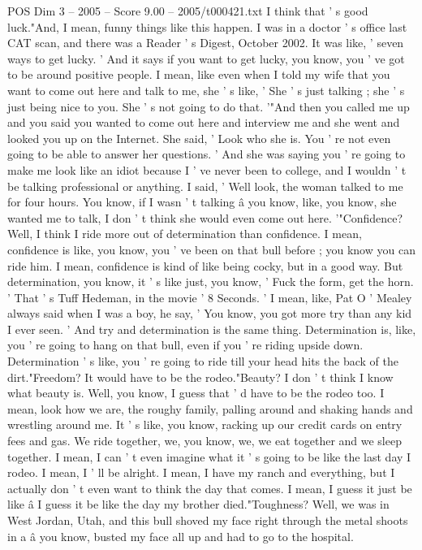 \begin{textsample}{POS Dim 3 – 2005 – Score 9.00 – 2005/t000421.txt}
I think that ' s good luck."And, I mean, funny things like this happen.
I was in a doctor ' s office last CAT scan, and there was a Reader ' s Digest, October 2002.
It was like, ' seven ways to get lucky. ' And it says if you want to get lucky, you know, you ' ve got to be around positive people.
I mean, like even when I told my wife that you want to come out here and talk to me, she ' s like, ' She ' s just talking ; she ' s just being nice to you.
She ' s not going to do that. '"And then you called me up and you said you wanted to come out here and interview me and she went and looked you up on the Internet.
She said, ' Look who she is.
You ' re not even going to be able to answer her questions. ' And she was saying you ' re going to make me look like an idiot because I ' ve never been to college, and I wouldn ' t be talking professional or anything.
I said, ' Well look, the woman talked to me for four hours.
You know, if I wasn ' t talking â you know, like, you know, she wanted me to talk, I don ' t think she would even come out here. '"Confidence?
Well, I think I ride more out of determination than confidence.
I mean, confidence is like, you know, you ' ve been on that bull before ; you know you can ride him.
I mean, confidence is kind of like being cocky, but in a good way.
But determination, you know, it ' s like just, you know, ' Fuck the form, get the horn. ' That ' s Tuff Hedeman, in the movie ' 8 Seconds. ' I mean, like, Pat O ' Mealey always said when I was a boy, he say, ' You know, you got more try than any kid I ever seen. ' And try and determination is the same thing.
Determination is, like, you ' re going to hang on that bull, even if you ' re riding upside down.
Determination ' s like, you ' re going to ride till your head hits the back of the dirt."Freedom?
It would have to be the rodeo."Beauty?
I don ' t think I know what beauty is.
Well, you know, I guess that ' d have to be the rodeo too.
I mean, look how we are, the roughy family, palling around and shaking hands and wrestling around me.
It ' s like, you know, racking up our credit cards on entry fees and gas.
We ride together, we, you know, we, we eat together and we sleep together.
I mean, I can ' t even imagine what it ' s going to be like the last day I rodeo.
I mean, I ' ll be alright.
I mean, I have my ranch and everything, but I actually don ' t even want to think the day that comes.
I mean, I guess it just be like â I guess it be like the day my brother died."Toughness?
Well, we was in West Jordan, Utah, and this bull shoved my face right through the metal shoots in a â you know, busted my face all up and had to go to the hospital.

\end{textsample}
